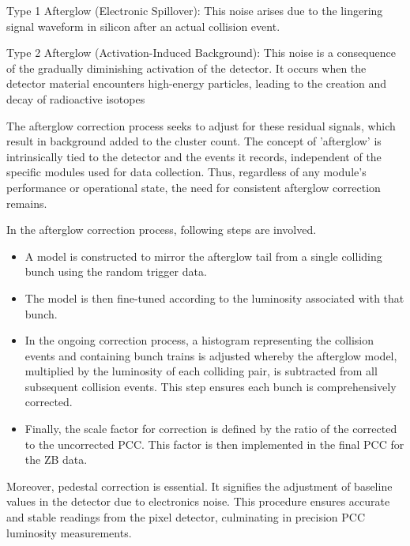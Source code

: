 Type 1 Afterglow (Electronic Spillover): This noise arises due to the lingering signal waveform in silicon after an actual collision event.

Type 2 Afterglow (Activation-Induced Background): This noise is a consequence of the gradually diminishing activation of the detector. It occurs when the detector material encounters high-energy particles, leading to the creation and decay of radioactive isotopes \cite{CMS-PAS-SMP-12-008} %

The afterglow correction process seeks to adjust for these residual signals, which result in background added to the cluster count. The concept of 'afterglow' is intrinsically tied to the detector and the events it records, independent of the specific modules used for data collection. Thus, regardless of any module's performance or operational state, the need for consistent afterglow correction remains.

In the afterglow correction process, following steps are involved.

\begin{itemize}
\item A model is constructed to mirror the afterglow tail from a single colliding bunch using the random trigger data.
\item The model is then fine-tuned according to the luminosity associated with that bunch.
\item In the ongoing correction process, a histogram representing the collision events and containing bunch trains is adjusted whereby the afterglow model, multiplied by the luminosity of each colliding pair, is subtracted from all subsequent collision events. This step ensures each bunch is comprehensively corrected.
\item Finally, the scale factor for correction is defined by the ratio of the corrected to the uncorrected PCC. This factor is then implemented in the final PCC for the ZB data. %
\end{itemize}

Moreover, pedestal correction is essential. It signifies the adjustment of baseline values in the detector due to electronics noise. This procedure ensures accurate and stable readings from the pixel detector, culminating in precision PCC luminosity measurements. %

